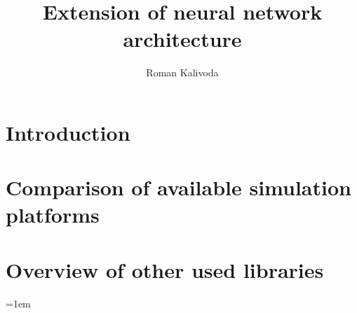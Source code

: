\documentclass[english,BP]{thesiskiv}
\author{Roman Kalivoda}
\title{Extension of neural network architecture}
\begin{document}
%
\maketitle
\tableofcontents

\chapter{Introduction}


\chapter{Comparison of available simulation platforms}


\chapter{Overview of other used libraries}


\appendix




% 
%
\emergencystretch=1em

\printbibliography[
heading=bibintoc
]

% 
% 
\end{document}
